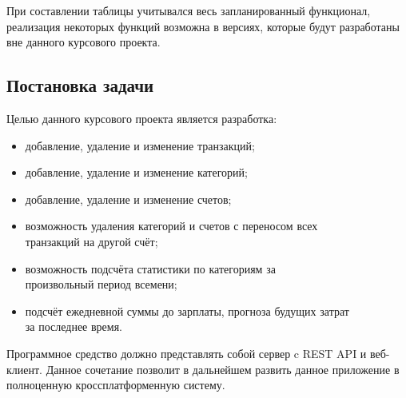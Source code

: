 При составлении таблицы учитывался
весь запланированный функционал, реализация некоторых функций возможна в
версиях, которые будут разработаны вне данного курсового проекта.

\subsection{Постановка задачи}

Целью данного курсового проекта является разработка:
\begin{itemize}
  \item добавление, удаление и изменение транзакций;
  \item добавление, удаление и изменение категорий;
  \item добавление, удаление и изменение счетов;
  \item возможность удаления категорий и счетов с переносом всех \\ транзакций на другой счёт;
  \item возможность подсчёта статистики по категориям за \\ произвольный период всемени;
  \item подсчёт ежедневной суммы до зарплаты, прогноза будущих затрат \\ за последнее время.
\end{itemize}

Программное средство должно представлять собой сервер c REST API и веб-клиент.
Данное сочетание позволит в дальнейшем развить данное приложение в полноценную
кроссплатформенную систему.